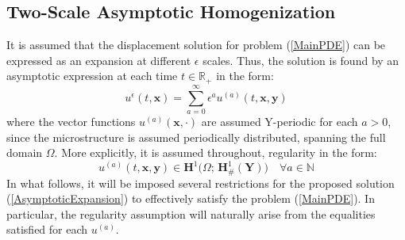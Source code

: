 


\subsection{Two-Scale Asymptotic Homogenization}
It is assumed that the displacement solution for problem (\ref{MainPDE}) can be expressed as an expansion at different $\epsilon$ scales. Thus, the solution is found by an asymptotic expression at each time $t \in \mathbb{R}_+$ in the form:
\begin{equation*}
    \label{AsymptoticExpansion}
    u^{\epsilon}(t, \mathbf{x}) = \sum_{a=0}^{\infty} \epsilon^a u^{(a)}(t, \mathbf{x},\mathbf{y}) 
\end{equation*}
where the vector functions $u^{(a)}(\mathbf{x}, \cdot)$ are assumed Y-periodic for each $a>0$, since the microstructure is assumed periodically distributed, spanning the full domain $\Omega$. More explicitly, it is assumed throughout, regularity in the form:
\begin{equation*}
    u^{(a)}(t, \mathbf{x},\mathbf{y}) \in \mathbf{H}^1\big(\Omega; \, \mathbf{H}^1_{\#}(\mathbf{Y})\big) \quad \forall a \in \mathbb{N}
\end{equation*}
In what follows, it will be imposed several restrictions for the proposed solution (\ref{AsymptoticExpansion}) to effectively satisfy the problem (\ref{MainPDE}). In particular, the regularity assumption will naturally arise from the equalities satisfied for each $u^{(a)}$.

